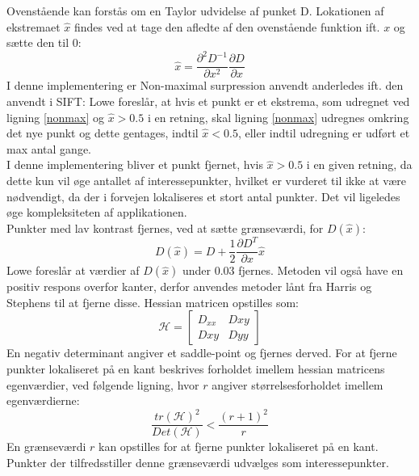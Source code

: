 Ovenstående kan forstås om en Taylor udvidelse af punket D.
Lokationen af ekstremaet $\hat{x}$ findes ved at tage den afledte af den ovenstående funktion ift. $x$ og sætte den til 0:
\begin{equation}
\hat{x}= \dfrac{\partial^2 D^{-1}}{\partial x^2}\dfrac{\partial D}{\partial x}
\label{xhat}
\end{equation}
I denne implementering er Non-maximal surpression anvendt anderledes ift. den anvendt i SIFT: Lowe foreslår, at hvis et punkt er et ekstrema, som udregnet ved ligning \ref{nonmax} og $\hat{x} > 0.5$ i en retning, skal ligning \eqref{nonmax} udregnes omkring det nye punkt og dette gentages, indtil $\hat{x} < 0.5$, eller indtil udregning er udført et max antal gange.
\\
I denne implementering bliver et punkt fjernet, hvis $\hat{x} > 0.5$ i en given retning, da dette kun vil øge antallet af interessepunkter, hvilket er vurderet til ikke at være nødvendigt, da der i forvejen lokaliseres et stort antal punkter. Det vil ligeledes øge kompleksiteten af applikationen.
\\
Punkter med lav kontrast fjernes, ved at sætte grænseværdi, for $D(\hat{x})$:
\begin{equation}
D(\hat{x})=D+\dfrac{1}{2}\dfrac{\partial D^T}{\partial x}\hat{x}
\label{dxhat}
\end{equation}
Lowe foreslår at værdier af $D(\hat{x})$ under 0.03 fjernes. Metoden vil også have en positiv respons overfor kanter, derfor anvendes metoder lånt fra Harris og Stephens \cite{harris} til at fjerne disse. Hessian matricen opstilles som:
\begin{equation}
\mathcal{H} =
\begin{bmatrix}
D_{xx} & D{xy} \\
D{xy} & D{yy}
\end{bmatrix}
\end{equation}
En negativ determinant angiver et saddle-point og fjernes derved. For at fjerne punkter lokaliseret på en kant beskrives forholdet imellem hessian matricens egenværdier, ved følgende ligning, hvor $r$ angiver størrelsesforholdet imellem egenværdierne:
\begin{equation}
\dfrac{tr(\mathcal{H})^2}{Det(\mathcal{H})}<\dfrac{(r+1)^2}{r}
\label{rval}
\end{equation}
En grænseværdi $r$ kan opstilles for at fjerne punkter lokaliseret på en kant. Punkter der tilfredsstiller denne grænseværdi udvælges som interessepunkter.
